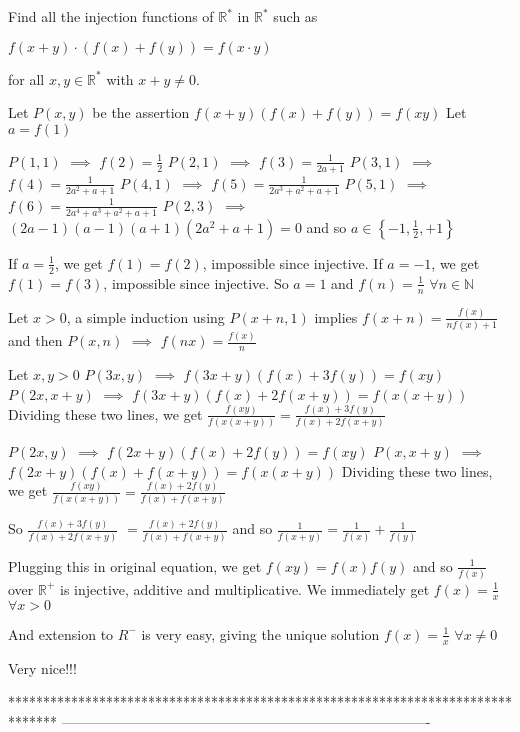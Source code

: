 \begin{solution}
	\begin{tcolorbox}Find all the injection functions of $ \mathbb{R^*} $ in $ \mathbb{R^*} $ such as

$ f(x+y) \cdot ( f(x)+f(y)) = f(x \cdot y) $

for all $x, y \in \mathbb{R^*}$ with $x+y \ne 0$.\end{tcolorbox}
Let $P(x,y)$ be the assertion $f(x+y)(f(x)+f(y))=f(xy)$
Let $a=f(1)$

$P(1,1)$ $\implies$ $f(2)=\frac 12$
$P(2,1)$ $\implies$ $f(3)=\frac 1{2a+1}$
$P(3,1)$ $\implies$ $f(4)=\frac 1{2a^2+a+1}$
$P(4,1)$ $\implies$ $f(5)=\frac 1{2a^3+a^2+a+1}$
$P(5,1)$ $\implies$ $f(6)=\frac 1{2a^4+a^3+a^2+a+1}$
$P(2,3)$ $\implies$ $(2a-1)(a-1)(a+1)(2a^2+a+1)=0$ and so $a\in\left\{-1,\frac 12,+1\right\}$

If $a=\frac 12$, we get $f(1)=f(2)$, impossible since injective.
If $a=-1$, we get $f(1)=f(3)$, impossible since injective.
So $a=1$ and $f(n)=\frac 1n$ $\forall n\in\mathbb N$

Let $x>0$, a simple induction using $P(x+n,1)$ implies $f(x+n)=\frac{f(x)}{nf(x)+1}$ and then $P(x,n)$ $\implies$ $f(nx)=\frac{f(x)}n$

Let $x,y>0$
$P(3x,y)$ $\implies$ $f(3x+y)(f(x)+3f(y))=f(xy)$
$P(2x,x+y)$ $\implies$ $f(3x+y)(f(x)+2f(x+y))=f(x(x+y))$
Dividing these two lines, we get $\frac{f(xy)}{f(x(x+y))}=\frac{f(x)+3f(y)}{f(x)+2f(x+y)}$

$P(2x,y)$ $\implies$ $f(2x+y)(f(x)+2f(y))=f(xy)$
$P(x,x+y)$ $\implies$ $f(2x+y)(f(x)+f(x+y))=f(x(x+y))$
Dividing these two lines, we get $\frac{f(xy)}{f(x(x+y))}=\frac{f(x)+2f(y)}{f(x)+f(x+y)}$

So $\frac{f(x)+3f(y)}{f(x)+2f(x+y)}$ $=\frac{f(x)+2f(y)}{f(x)+f(x+y)}$ and so $\frac 1{f(x+y)}=\frac 1{f(x)}+\frac 1{f(y)}$

Plugging this in original equation, we get $f(xy)=f(x)f(y)$ and so $\frac 1{f(x)}$ over $\mathbb R^+$ is injective, additive and multiplicative.
We immediately get $f(x)=\frac 1x$ $\forall x>0$

And extension to $R^-$ is very easy, giving the unique solution $\boxed{f(x)=\frac 1x}$ $\forall x\ne 0$
\end{solution}



\begin{solution}
	Very nice!!!
\end{solution}
*******************************************************************************
-------------------------------------------------------------------------------

